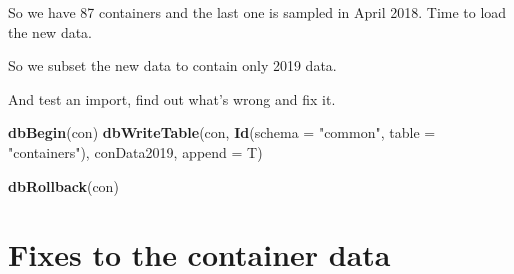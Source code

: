 \documentclass[]{article}
\newenvironment{Shaded}{\begin{snugshade}}{\end{snugshade}}
\newcommand{\CommentTok}[1]{\textcolor[rgb]{0.56,0.35,0.01}{\textit{#1}}}
\newcommand{\DataTypeTok}[1]{\textcolor[rgb]{0.13,0.29,0.53}{#1}}
\newcommand{\DecValTok}[1]{\textcolor[rgb]{0.00,0.00,0.81}{#1}}
\newcommand{\KeywordTok}[1]{\textcolor[rgb]{0.13,0.29,0.53}{\textbf{#1}}}
\newcommand{\NormalTok}[1]{#1}
\newcommand{\OperatorTok}[1]{\textcolor[rgb]{0.81,0.36,0.00}{\textbf{#1}}}
\newcommand{\StringTok}[1]{\textcolor[rgb]{0.31,0.60,0.02}{#1}}
\begin{document}
So we have 87 containers and the last one is sampled in April 2018. Time
to load the new data.

\begin{Shaded}
\end{Shaded}

So we subset the new data to contain only 2019 data.

\begin{Shaded}
\end{Shaded}

And test an import, find out what's wrong and fix it.

\begin{Shaded}
\begin{Highlighting}[]
\KeywordTok{dbBegin}\NormalTok{(con)}
\KeywordTok{dbWriteTable}\NormalTok{(con,}
             \KeywordTok{Id}\NormalTok{(}\DataTypeTok{schema =} \StringTok{"common"}\NormalTok{, }\DataTypeTok{table =} \StringTok{"containers"}\NormalTok{),}
\NormalTok{             conData2019,}
             \DataTypeTok{append =}\NormalTok{ T)}

\KeywordTok{dbRollback}\NormalTok{(con)}
\end{Highlighting}
\end{Shaded}

\hypertarget{fixes-to-the-container-data}{%
\section{Fixes to the container
data}\label{fixes-to-the-container-data}}
\end{document}

